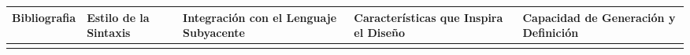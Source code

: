 \begin{longtable}{  p{2.15cm}  p{2.4cm}  p{4.75cm}  p{4.65cm}  p{5.45cm} }
    \hline
    \textbf{Bibliografia}                                                                                                                                                                                                                                                                                                        &
    \textbf{Estilo de la Sintaxis}                                                                                                                                                                                                                                                                                               &
    \textbf{Integración con el Lenguaje Subyacente}                                                                                                                                                                                                                                                                              &
    \textbf{Características que Inspira el Diseño}                                                                                                                                                                                                                                                                               &
    \textbf{Capacidad de Generación y Definición}                                                                                                                                                                                                                                                                                  \\
    \hline
    \rowcolor{lavender}


\end{longtable}
